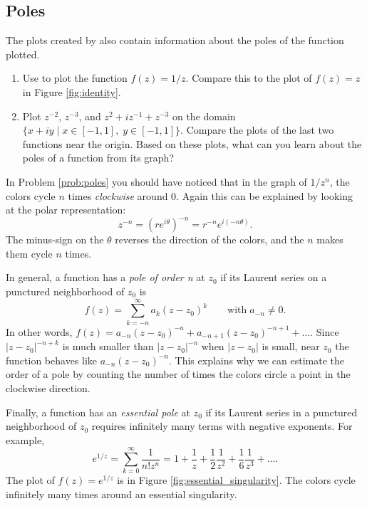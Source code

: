 \subsection*{Poles}

The plots created by  also contain information about the poles of the function plotted.

\begin{problem}\label{prob:poles}
\leavevmode
\begin{enumerate}
\item Use  to plot the function $f(z) = 1/z$.
Compare this to the plot of $f(z)=z$ in Figure \ref{fig:identity}.
\item Plot $z^{-2}$, $z^{-3}$, and $z^2+iz^{-1}+z^{-3}$ on the domain $\{x+iy \mid x \in [-1,1] , \; y \in [-1,1]\}$.
Compare the plots of the last two functions near the origin.
Based on these plots, what can you learn about the poles of a function from its graph?
\end{enumerate}
\end{problem}

In Problem \ref{prob:poles} you should have noticed that in the graph of $1/z^{n}$, the colors cycle $n$ times \emph{clockwise} around 0.
Again this can be explained by looking at the polar representation:
\[
z^{-n} = (re^{i \theta})^{-n} = r^{-n} e^{i(-n\theta)}.
\]
The minus-sign on the $\theta$ reverses the direction of the colors, and the $n$ makes them cycle $n$ times.

In general, a function has a \emph{pole of order n} at $z_0$ if its Laurent series on a punctured neighborhood of $z_0$ is
\[
f(z) = \sum_{k=-n}^\infty a_k(z-z_0)^k  \qquad \text{with} \; a_{-n} \neq 0.
\]
In other words, $f(z) = a_{-n}(z-z_0)^{-n}+a_{-n+1}(z-z_0)^{-n+1} + \ldots$.
Since $|z-z_0|^{-n+k}$ is much smaller than $|z-z_0|^{-n}$ when $|z-z_0|$ is small, near $z_0$ the function behaves like $a_{-n}(z-z_0)^{-n}$.
This explains why we can estimate the order of a pole by counting the number of times the colors circle a point in the clockwise direction.

Finally, a function has an \emph{essential pole} at $z_0$ if its Laurent series in a punctured neighborhood of $z_0$ requires infinitely many terms with negative exponents.
For example,
\[
e^{1/z} = \sum_{k=0}^{\infty}\frac{1}{n! z^n} = 1+\frac{1}{z}+\frac{1}{2}\frac{1}{z^2}+\frac{1}{6}\frac{1}{z^3}+\ldots.
\]
The plot of $f(z) = e^{1/z}$ is in Figure \ref{fig:essential_singularity}.
The colors cycle infinitely many times around an essential singularity.

